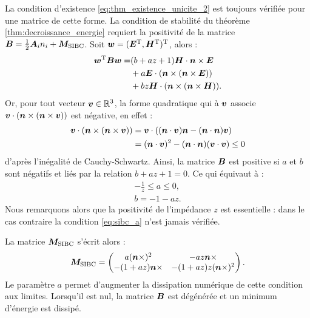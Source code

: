 La condition d’existence \eqref{eq:thm_existence_unicite_2} est toujours
vérifiée pour une matrice de cette forme.
La condition de stabilité du théorème
\ref{thm:decroissance_energie} requiert la positivité de la matrice
$\bm{B} = \frac{1}{2} {\bm{A}_{i}n_{i}} + \bm{M}_{\mathrm{SIBC}}$.
Soit $\bm{w} = (\bm{E}^{\mathrm{T}}, \bm{H}^{\mathrm{T}})^{\mathrm{T}}$, alors :
\begin{equation}
	\begin{aligned}
		\bm{w}^{\mathrm{T}} \bm{B} \bm{w}
		= &(b + a z + 1) \bm{H} \cdot \bm{n} \times \bm{E} \\
		&+ a \bm{E} \cdot (\bm{n} \times (\bm{n} \times \bm{E} )) \\
		&+ b z \bm{H} \cdot (\bm{n} \times (\bm{n} \times \bm{H} )) .
	\end{aligned}
\end{equation}
Or, pour tout vecteur $\bm{v} \in \mathbb{R}^{3}$, la forme quadratique qui à
$\bm{v}$ associe $\bm{v}\cdot(\bm{n}\times(\bm{n}\times\bm{v}))$
est négative, en effet :
\begin{equation}
	\begin{aligned}
		\bm{v} \cdot (\bm{n} \times (\bm{n} \times \bm{v}))
		&= \bm{v} \cdot ((\bm{n} \cdot \bm{v}) \bm{n}
			- (\bm{n} \cdot \bm{n}) \bm{v}) \\
		&= (\bm{n} \cdot \bm{v})^2 
			- (\bm{n} \cdot \bm{n}) (\bm{v} \cdot \bm{v})
		\le 0
	\end{aligned}
\end{equation}
d’après l’inégalité de Cauchy-Schwartz.
Ainsi, la matrice $\bm{B}$ est positive si $a$ et $b$ sont négatifs
et liés par la relation $b + a z + 1 = 0$.
Ce qui équivaut à :
\begin{subequations}
	\begin{align}
		- \frac{1}{z} \le a \le 0
		\label{eq:sibc_a} , \\
		b = - 1 - a z .
	\end{align}
\end{subequations}
Nous remarquons alors que la positivité de l’impédance $z$
est essentielle : dans le cas contraire la condition 
\eqref{eq:sibc_a} n'est jamais vérifiée.

La matrice $\bm{M}_{\mathrm{SIBC}}$ s'écrit alors :
\begin{align}
	\bm{M}_{\mathrm{SIBC}} =
	\begin{pmatrix}
		a (\bm{n} \times)^2 & - a z \bm{n} \times \\
		- (1 + a z) \bm{n} \times & - (1 + a z) z (\bm{n} \times)^2
	\end{pmatrix}
	\label{eq:mat_sibc} .
\end{align}
Le paramètre $a$ permet d'augmenter la dissipation numérique de cette condition
aux limites. Lorsqu’il est nul, la matrice $\bm{B}$ est dégénérée et un
minimum d'énergie est dissipé.
\\

